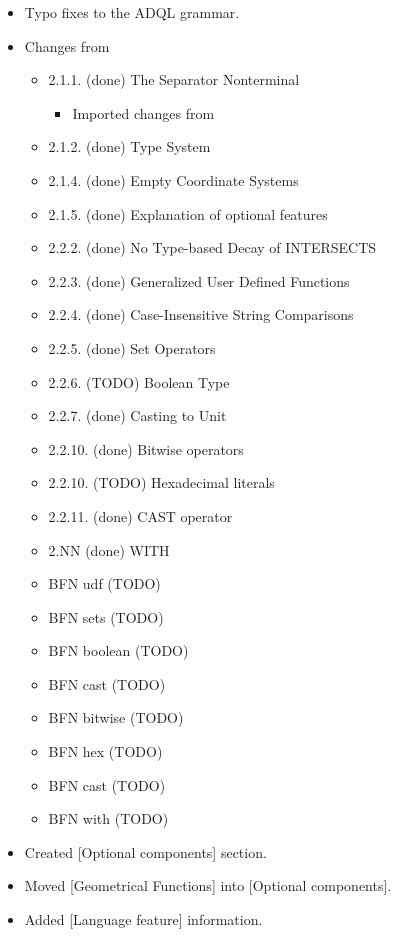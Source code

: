 \documentclass[11pt,a4paper]{ivoa}
\begin{document}
\begin{itemize}
    \item Typo fixes to the ADQL grammar.

    \item Changes from \citet{note:TAPNotes}
        \begin{itemize}

            \item 2.1.1.  (done) The Separator Nonterminal
            \begin{itemize}
                \item Imported changes from \citet{note:ADQL2Err1}
            \end{itemize}
                
            \item 2.1.2.  (done) Type System
            \item 2.1.4.  (done) Empty Coordinate Systems
            \item 2.1.5.  (done) Explanation of optional features
            \item 2.2.2.  (done) No Type-based Decay of INTERSECTS
            \item 2.2.3.  (done) Generalized User Defined Functions
            \item 2.2.4.  (done) Case-Insensitive String Comparisons
            \item 2.2.5.  (done) Set Operators
            \item 2.2.6.  (TODO) Boolean Type
            \item 2.2.7.  (done) Casting to Unit
            \item 2.2.10. (done) Bitwise operators
            \item 2.2.10. (TODO) Hexadecimal literals
            \item 2.2.11. (done) CAST operator
            \item 2.NN    (done) WITH

            \item BFN udf (TODO)
            \item BFN sets (TODO)
            \item BFN boolean (TODO)
            \item BFN cast (TODO)
            \item BFN bitwise (TODO)
            \item BFN hex (TODO)
            \item BFN cast (TODO)
            \item BFN with (TODO)

        \end{itemize}

    \item Created [Optional components] section.
    \item Moved [Geometrical Functions] into [Optional components].
    \item Added [Language feature] information.

\end{itemize}


\end{document}

